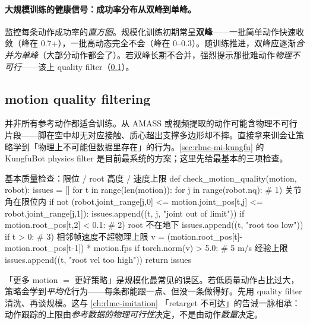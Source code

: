 \paragraph{大规模训练的健康信号：成功率分布从双峰到单峰。}监控每条动作成功率的\emph{直方图}。规模化训练初期常呈\textbf{双峰}——一批简单动作快速收敛（峰在 0.7+），一批高动态完全不会（峰在 0--0.3）。随训练推进，双峰应逐渐\emph{合并为单峰}（大部分动作都会了）。若双峰长期不合并，强烈提示那批难动作\emph{物理不可行}——该上 quality filter（\cref{sec:rlmc-mi-scale-filter}）。

\subsection{motion quality filtering}
\label{sec:rlmc-mi-scale-filter}

并非所有参考动作都适合训练。从 AMASS 或视频提取的动作可能含物理不可行片段——脚在空中却无对应接触、质心超出支撑多边形却不摔。直接拿来训会让策略学到「物理上不可能但数据里存在」的行为。\cref{sec:rlmc-mi-kungfu} 的 KungfuBot physics filter 是目前最系统的方案；这里先给最基本的三项检查。

\begin{codebox}[Python]{基本质量检查：限位 / root 高度 / 速度上限}
def check_motion_quality(motion, robot):
    issues = []
    for t in range(len(motion)):
        for j in range(robot.nq):                          # 1) 关节角在限位内
            if not (robot.joint_range[j,0] <= motion.joint_pos[t,j] <= robot.joint_range[j,1]):
                issues.append((t, j, "joint out of limit"))
        if motion.root_pos[t,2] < 0.1:                     # 2) root 不在地下
            issues.append((t, "root too low"))
        if t > 0:                                          # 3) 相邻帧速度不超物理上限
            v = (motion.root_pos[t]-motion.root_pos[t-1]) * motion.fps
            if torch.norm(v) > 5.0:                        # 5 m/s 经验上限
                issues.append((t, "root vel too high"))
    return issues
\end{codebox}

\begin{insight}[质量优先于数量]\label{ins:rlmc-mi-quality}
「更多 motion $=$ 更好策略」是规模化最常见的误区。若低质量动作占比过大，策略会学到\emph{平均化}行为——每条都能跟一点、但没一条做得好。先用 quality filter 清洗、再谈规模。这与 \cref{ch:rlmc-imitation} 「retarget 不可达」的告诫一脉相承：动作跟踪的上限由\emph{参考数据的物理可行性}决定，不是由动作\emph{数量}决定。
\end{insight}

